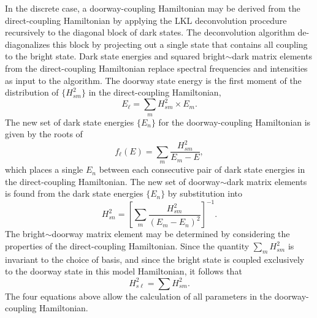\documentclass[12pt]{mitthesis}
\begin{document}
In the discrete case, a doorway-coupling Hamiltonian may be derived
from the direct-coupling Hamiltonian by applying the LKL deconvolution
procedure recursively to the diagonal block of dark states.  The
deconvolution algorithm de-diagonalizes this block by projecting out a
single state that contains all coupling to the bright state.  Dark
state energies and squared bright$\sim$dark matrix elements from the
direct-coupling Hamiltonian replace spectral frequencies and
intensities as input to the algorithm.  The doorway state energy is
the first moment of the distribution of $\lbrace H_{sm}^2 \rbrace$ in
the direct-coupling Hamiltonian,
\begin{equation}
  \label{eq:dse-discrete}
  E_{\ell} = \sum_m H_{sm}^2 \times E_m.
\end{equation}
The new set of dark state energies $\lbrace E_n \rbrace$ for the
doorway-coupling Hamiltonian is given by the roots of
\begin{equation}
  f_{\ell}(E) = \sum_m \frac{H_{sm}^2}{E_m - E},
\end{equation}
which places a single $E_n$ between each consecutive pair of dark
state energies in the direct-coupling Hamiltonian.  The new set of
doorway$\sim$dark matrix elements is found from the dark state
energies $\lbrace E_n \rbrace$ by substitution into
\begin{equation}
  H_{sn}^2 = 
  \left [
    \sum_m \frac{H_{sm}^2}{(E_m - E_n)^2}
  \right ]^{-1}.
\end{equation}
The bright$\sim$doorway matrix element may be determined by
considering the properties of the direct-coupling Hamiltonian.  Since
the quantity $\sum_m H_{sm}^2$ is invariant to the choice of basis,
and since the bright state is coupled exclusively to the doorway state
in this model Hamiltonian, it follows that
\begin{equation}
  \label{eq:doorway-me}
  H_{s\ell}^2 = \sum H_{sm}^2.
\end{equation}
The four equations above allow the calculation of all parameters in
the doorway-coupling Hamiltonian.
\end{document}
